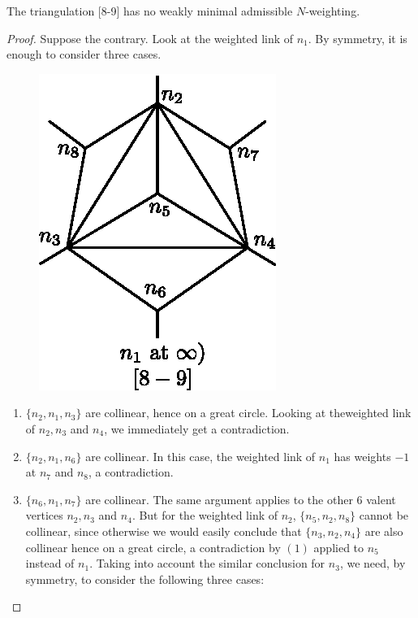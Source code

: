 \begin{lemma}\label{chap1:lem9.16}
The triangulation [8-9] has no weakly minimal admissible
$N$-weighting. 
\end{lemma}

\begin{proof}
Suppose the contrary. Look at the weighted link of $n_1$.  By
symmetry, it is enough to consider three cases. 
\begin{figure}[H]
\centering 
\includegraphics{vol58-fig/fig58-51.eps} 
\end{figure}

\begin{enumerate}
\item $\{ n_2, n_1, n_3 \}$ are collinear, hence on a great
  circle. Looking at the\pageoriginale weighted link of $n_2, n_3$ and
  $n_4$, we immediately get a contradiction.  

\item $\{ n_2, n_1, n_6 \}$ are collinear.  In this case,  the 
  weighted link of $n_1$ has weights $-1$ at $n_7$ and $n_8$, a
  contradiction. 

\item $\{ n_6, n_1, n_7 \}$ are collinear.  The same argument applies 
  to the other $6$ valent vertices $n_2, n_3$ and $n_4$.  But for the
  weighted link of $n_2$, $\{ n_5, n_2, n_8 \}$ cannot be collinear,
  since otherwise we would easily conclude that $\{ n_3, n_2, n_4 \}$
  are also collinear hence on a great circle,  a contradiction by
  $(1)$ applied to $n_5$ instead of $n_1$.  Taking into account the
  similar conclusion for $n_3$, we need, by symmetry,  to consider the
  following three cases: 
\end{enumerate}
\end{proof}


